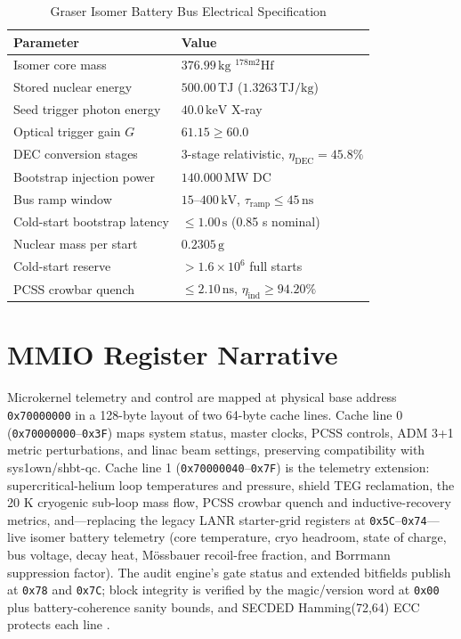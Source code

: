 \documentclass[10pt,journal,compsoc]{IEEEtran}
\begin{document}
\begin{table}[h]
\centering
\caption{Graser Isomer Battery Bus Electrical Specification}
\label{tab:isomerbus}
\small
\setlength{\tabcolsep}{4pt}
\begin{tabular}{ll}
\toprule
\textbf{Parameter} & \textbf{Value} \\
\midrule
Isomer core mass                & $376.99\,\mathrm{kg}$ $^{178\mathrm{m}2}\mathrm{Hf}$ \\
Stored nuclear energy           & $500.00\,\mathrm{TJ}$ ($1.3263\,\mathrm{TJ/kg}$) \\
Seed trigger photon energy      & $40.0\,\mathrm{keV}$ X-ray \\
Optical trigger gain $G$        & $61.15 \ge 60.0$ \\
DEC conversion stages           & 3-stage relativistic, $\eta_{\mathrm{DEC}} = 45.8\%$ \\
Bootstrap injection power       & $140.000\,\mathrm{MW}$ DC \\
Bus ramp window                 & $15\text{--}400\,\mathrm{kV}$, $\tau_{\mathrm{ramp}} \le 45\,\mathrm{ns}$ \\
Cold-start bootstrap latency    & $\le 1.00\,\mathrm{s}$ (0.85 s nominal) \\
Nuclear mass per start          & $0.2305\,\mathrm{g}$ \\
Cold-start reserve              & $> 1.6\times10^{6}$ full starts \\
PCSS crowbar quench             & $\le 2.10\,\mathrm{ns}$, $\eta_{\mathrm{ind}} \ge 94.20\%$ \\
\bottomrule
\end{tabular}
\end{table}

\section{MMIO Register Narrative}
Microkernel telemetry and control are mapped at physical base address
\texttt{0x70000000} in a 128-byte layout of two 64-byte cache lines.
Cache line 0 (\texttt{0x70000000}--\texttt{0x3F}) maps system status,
master clocks, PCSS controls, ADM 3+1 metric perturbations, and linac beam
settings, preserving compatibility with sys1own/shbt-qc. Cache line 1
(\texttt{0x70000040}--\texttt{0x7F}) is the telemetry extension:
supercritical-helium loop temperatures and pressure, shield TEG
reclamation, the 20 K cryogenic sub-loop mass flow, PCSS crowbar quench
and inductive-recovery metrics, and---replacing the legacy LANR
starter-grid registers at \texttt{0x5C}--\texttt{0x74}---live isomer
battery telemetry (core temperature, cryo headroom, state of charge,
bus voltage, decay heat, Mössbauer recoil-free fraction, and Borrmann
suppression factor). The audit engine's gate status and extended
bitfields publish at \texttt{0x78} and \texttt{0x7C}; block integrity is
verified by the magic/version word at \texttt{0x00} plus battery-coherence
sanity bounds, and SECDED Hamming(72,64) ECC protects each line
\cite{sys1own_twin2026}.
\end{document}
